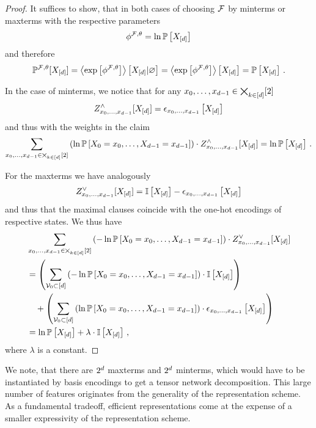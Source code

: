 \begin{proof}
	It suffices to show, that in both cases of choosing $\mathcal{F}$ by minterms or maxterms with the respective parameters
		\[ \phi^{\mathcal{F},\theta} =  \ln\mathbb{P}\left[X_{[d]}\right] \]
	and therefore
		\[ \mathbb{P}^{\mathcal{F},\theta}[X_{[d]}] 
		= \left\langle \mathrm{exp}\left[\phi^{\mathcal{F},\theta}\right]\right\rangle \left[ X_{[d]} | \varnothing \right]
		=  \left\langle \mathrm{exp}\left[\phi^{\mathcal{F},\theta}\right]\right\rangle \left[ X_{[d]} \right]
		= \mathbb{P}\left[X_{[d]}\right]\, . \]
	
	In the case of minterms, we notice that for any ${x_{0},\ldots,x_{d-1}}\in\bigtimes_{k\in[d]}[2]$
		\[ Z^{\land}_{{x_{0},\ldots,x_{d-1}}}[X_{[d]}] = \epsilon_{{x_{0},\ldots,x_{d-1}}}\left[X_{[d]}\right] \]
	and thus with the weights in the claim
		\[ \sum_{{x_{0},\ldots,x_{d-1}}\in\bigtimes_{k\in[d]}[2]} 
		\left( \ln \mathbb{P}\left[X_{0}=x_{0},\ldots,X_{d-1}=x_{d-1}\right] \right) \cdot Z^{\land}_{{x_{0},\ldots,x_{d-1}}}[X_{[d]}]
		= \ln\mathbb{P}\left[X_{[d]}\right] \, .
		 \]

	For the maxterms we have analogously
		\[ Z^{\lor}_{{x_{0},\ldots,x_{d-1}}}[X_{[d]}] = \mathbb{I}\left[X_{[d]}\right] - \epsilon_{x_{0},\ldots,x_{d-1}}\left[X_{[d]}\right] \]
	and thus that the maximal clauses coincide with the one-hot encodings of respective states.
	We thus have
	\begin{align*}
		& \sum_{{x_{0},\ldots,x_{d-1}}\in\bigtimes_{k\in[d]}[2]} 
		\left( - \ln \mathbb{P}\left[X_{0}=x_{0},\ldots,X_{d-1}=x_{d-1}\right] \right) \cdot Z^{\lor}_{{x_{0},\ldots,x_{d-1}}}[X_{[d]}] \\
		& =
		\left(  \sum_{\mathcal{V}_0\subset [d]} 
		\left( - \ln \mathbb{P}\left[X_{0}=x_{0},\ldots,X_{d-1}=x_{d-1}\right] \right) \cdot \mathbb{I}\left[X_{[d]}\right] \right) \\
		& \quad + 
		\left(  \sum_{\mathcal{V}_0\subset [d]} 
		\left(  \ln \mathbb{P}\left[X_{0}=x_{0},\ldots,X_{d-1}=x_{d-1}\right] \right) \cdot
		\epsilon_{x_{0},\ldots,x_{d-1}}\left[X_{[d]}\right] 
		\right) 
		 \\
		 & = \ln\mathbb{P}\left[X_{[d]}\right] + \lambda \cdot  \mathbb{I}\left[X_{[d]}\right]\,,
	\end{align*}
	where $\lambda$ is a constant.
\end{proof}

We note, that there are $2^{d}$ maxterms and $2^{d}$ minterms, which would have to be instantiated by basis encodings to get a tensor network decomposition.
This large number of features originates from the generality of the representation scheme.
As a fundamental tradeoff, efficient representations come at the expense of a smaller expressivity of the representation scheme.




